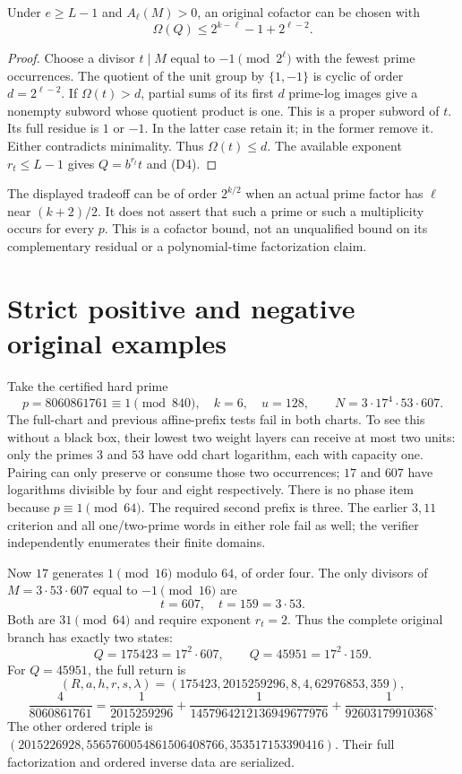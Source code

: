 \begin{corollary}
Under $e\ge L-1$ and $A_\ell(M)>0$, an original cofactor can be chosen with
\[
 \boxed{\Omega(Q)\le 2^{k-\ell}-1+2^{\ell-2}.}              \tag{D4}
\]
\end{corollary}
\begin{proof}
Choose a divisor $t\mid M$ equal to $-1\pmod{2^\ell}$ with the fewest prime
occurrences. The quotient of the unit group by $\{1,-1\}$ is cyclic of order
$d=2^{\ell-2}$. If $\Omega(t)>d$, partial sums of its first $d$ prime-log
images give a nonempty subword whose quotient product is one. This is a proper
subword of $t$. Its full residue is $1$ or $-1$. In the latter case retain it;
in the former remove it. Either contradicts minimality. Thus $\Omega(t)\le d$.
The available exponent $r_t\le L-1$ gives $Q=b^{r_t}t$ and (D4).
\end{proof}
The displayed tradeoff can be of order $2^{k/2}$ when an actual prime factor
has $\ell$ near $(k+2)/2$. It does not assert that such a prime or such a
multiplicity occurs for every $p$. This is a cofactor bound, not an unqualified
bound on its complementary residual or a polynomial-time factorization claim.

\section{Strict positive and negative original examples}
Take the certified hard prime
\[
 \boxed{p=8060861761\equiv1\pmod{840},\quad k=6,\quad u=128,}\qquad
 N=3\cdot17^4\cdot53\cdot607.                              \tag{E1}
\]
The full-chart and previous affine-prefix tests fail in both charts. To see
this without a black box, their lowest two weight layers can receive at most
two units: only the primes $3$ and $53$ have odd chart logarithm, each with
capacity one. Pairing can only preserve or consume those two occurrences;
$17$ and $607$ have logarithms divisible by four and eight respectively.
There is no phase item because $p\equiv1\pmod{64}$. The required second prefix
is three. The earlier $3,11$ criterion and all one/two-prime words in either
role fail as well; the verifier independently enumerates their finite domains.

Now $17$ generates $1\pmod{16}$ modulo $64$, of order four.
The only divisors of $M=3\cdot53\cdot607$ equal to $-1\pmod{16}$ are
\[
 t=607,\quad t=159=3\cdot53.
\]
Both are $31\pmod{64}$ and require exponent $r_t=2$.
Thus the complete original branch has exactly two states:
\[
 Q=175423=17^2\cdot607,\qquad Q=45951=17^2\cdot159.          \tag{E2}
\]
For $Q=45951$, the full return is
\[
 (R,a,h,r,s,\lambda)=(175423,2015259296,8,4,62976853,359),
\]
\[
 \boxed{\frac4{8060861761}=\frac1{2015259296}
 +\frac1{1457964212136949677976}+\frac1{92603179910368}.}     \tag{E3}
\]
The other ordered triple is
$(2015226928,5565760054861506408766,353517153390416)$.
Their full factorization and ordered inverse data are serialized.

